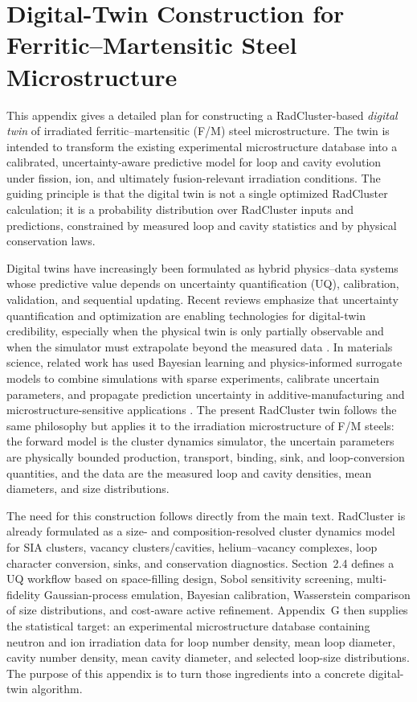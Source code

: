 \appendix
\section{Digital-Twin Construction for Ferritic--Martensitic Steel Microstructure}
\label{app:radcluster_digital_twin}

This appendix gives a detailed plan for constructing a RadCluster-based
\emph{digital twin} of irradiated ferritic--martensitic (F/M) steel
microstructure.  The twin is intended to transform the existing experimental
microstructure database into a calibrated, uncertainty-aware predictive model
for loop and cavity evolution under fission, ion, and ultimately fusion-relevant
irradiation conditions.  The guiding principle is that the digital twin is not a
single optimized RadCluster calculation; it is a probability distribution over
RadCluster inputs and predictions, constrained by measured loop and cavity
statistics and by physical conservation laws.

Digital twins have increasingly been formulated as hybrid physics--data systems
whose predictive value depends on uncertainty quantification (UQ), calibration,
validation, and sequential updating.  Recent reviews emphasize that uncertainty
quantification and optimization are enabling technologies for digital-twin
credibility, especially when the physical twin is only partially observable and
when the simulator must extrapolate beyond the measured data
\citep{Thelen2022DigitalTwinUQ}.  In materials science, related work has used
Bayesian learning and physics-informed surrogate models to combine simulations
with sparse experiments, calibrate uncertain parameters, and propagate
prediction uncertainty in additive-manufacturing and microstructure-sensitive
applications \citep{Wang2020AMUQ,Kim2022BayesianAM,Robertson2026VDMN}.
The present RadCluster twin follows the same philosophy but applies it to the
irradiation microstructure of F/M steels: the forward model is the cluster
dynamics simulator, the uncertain parameters are physically bounded production,
transport, binding, sink, and loop-conversion quantities, and the data are the
measured loop and cavity densities, mean diameters, and size distributions.

The need for this construction follows directly from the main text.  RadCluster
is already formulated as a size- and composition-resolved cluster dynamics model
for SIA clusters, vacancy clusters/cavities, helium--vacancy complexes, loop
character conversion, sinks, and conservation diagnostics.  Section~2.4 defines
a UQ workflow based on space-filling design, Sobol sensitivity screening,
multi-fidelity Gaussian-process emulation, Bayesian calibration, Wasserstein
comparison of size distributions, and cost-aware active refinement.  Appendix~G
then supplies the statistical target: an experimental microstructure database
containing neutron and ion irradiation data for loop number density, mean loop
diameter, cavity number density, mean cavity diameter, and selected loop-size
distributions.  The purpose of this appendix is to turn those ingredients into a
concrete digital-twin algorithm.

